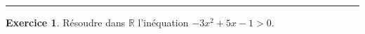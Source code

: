 \documentclass{exam}
\theoremstyle{definition}
\newtheorem{exercice}{Exercice}
\begin{document}
\hrule

\vspace{1em}
\setcounter{exercice}{0}



\begin{exercice}
    Résoudre dans \( \mathbb{R} \) l'inéquation \(-3x^2 + 5x - 1 > 0\).
    \begin{center}
        \framebox[1\textwidth]{\parbox{5.5in}{%
        \vspace{10em}}}
    \end{center}
\end{exercice}
\end{document}
